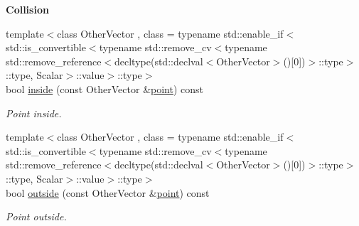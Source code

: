 \begin{Indent}{\bf Collision}\par
\begin{DoxyCompactItemize}
\item 
{\footnotesize template$<$class Other\-Vector , class  = typename std\-::enable\-\_\-if$<$std\-::is\-\_\-convertible$<$typename std\-::remove\-\_\-cv$<$typename std\-::remove\-\_\-reference$<$decltype(std\-::declval$<$\-Other\-Vector$>$()\mbox{[}0\mbox{]})$>$\-::type$>$\-::type, Scalar$>$\-::value$>$\-::type$>$ }\\bool \hyperlink{classmagrathea_1_1AbstractHyperCube_a0fd1a2a8ee4af9823606cd4bfa0ba3a7}{inside} (const Other\-Vector \&\hyperlink{miscellaneous_8h_af4785a592bbb7b2a8882c18bb0101192}{point}) const 
\begin{DoxyCompactList}\small\item\em Point inside. \end{DoxyCompactList}\item 
{\footnotesize template$<$class Other\-Vector , class  = typename std\-::enable\-\_\-if$<$std\-::is\-\_\-convertible$<$typename std\-::remove\-\_\-cv$<$typename std\-::remove\-\_\-reference$<$decltype(std\-::declval$<$\-Other\-Vector$>$()\mbox{[}0\mbox{]})$>$\-::type$>$\-::type, Scalar$>$\-::value$>$\-::type$>$ }\\bool \hyperlink{classmagrathea_1_1AbstractHyperCube_a3d82e1fae74385b35ed4957b69b0d3ec}{outside} (const Other\-Vector \&\hyperlink{miscellaneous_8h_af4785a592bbb7b2a8882c18bb0101192}{point}) const 
\begin{DoxyCompactList}\small\item\em Point outside. \end{DoxyCompactList}\end{DoxyCompactItemize}
\end{Indent}
